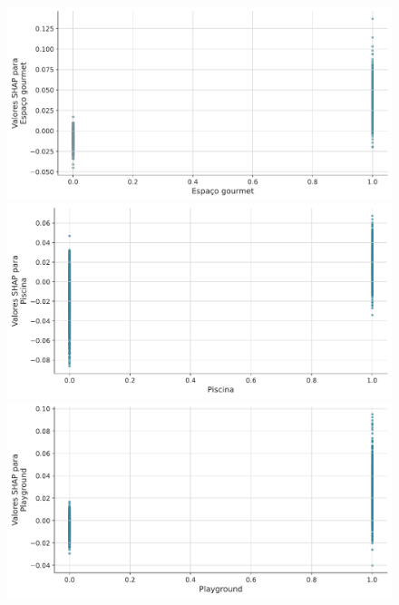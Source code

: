 \documentclass[
  12pt,
  a4paper,
]{scrreprt}
\begin{document}
\begin{figure}
\newline
\begin{minipage}{0.33\linewidth}
\includegraphics{TCC_files/mediabag/includes/dependence_plot_cat/dep_plot_espaco_gourmet.pdf}\end{minipage}%
%
\begin{minipage}{0.33\linewidth}
\includegraphics{TCC_files/mediabag/includes/dependence_plot_cat/dep_plot_piscina.pdf}\end{minipage}%
%
\begin{minipage}{0.33\linewidth}
\includegraphics{TCC_files/mediabag/includes/dependence_plot_cat/dep_plot_playground.pdf}\end{minipage}%

\end{figure}
\end{document}
